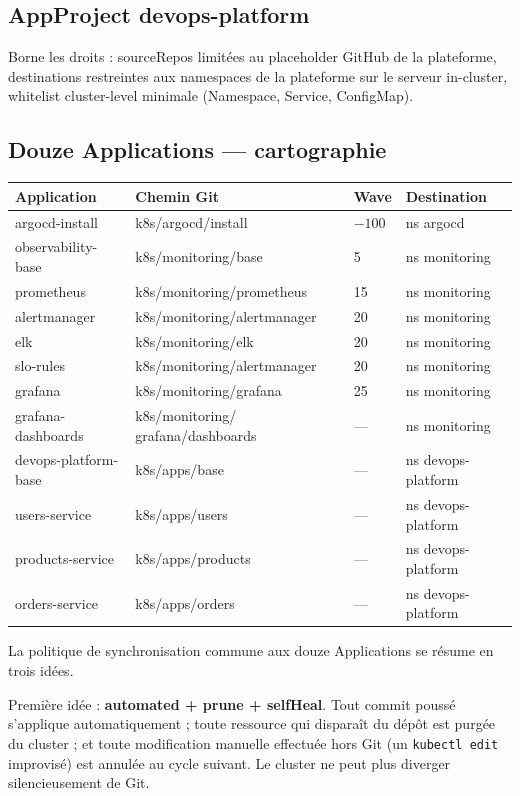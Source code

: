 \documentclass[12pt,a4paper]{article}
\begin{document}
\subsection{AppProject devops-platform}
Borne les droits : sourceRepos limitées au placeholder GitHub de la plateforme, destinations restreintes aux namespaces de la plateforme sur le serveur in-cluster, whitelist cluster-level minimale (Namespace, Service, ConfigMap).

\subsection{Douze Applications --- cartographie}
\begin{longtable}{@{}p{3.4cm}p{5.2cm}p{1.6cm}p{3.4cm}@{}}
\toprule
\textbf{Application} & \textbf{Chemin Git} & \textbf{Wave} & \textbf{Destination} \\
\midrule
\endhead
argocd-install & k8s/argocd/install & $-100$ & ns argocd \\
observability-base & k8s/monitoring/base & 5 & ns monitoring \\
prometheus & k8s/monitoring/prometheus & 15 & ns monitoring \\
alertmanager & k8s/monitoring/alertmanager & 20 & ns monitoring \\
elk & k8s/monitoring/elk & 20 & ns monitoring \\
slo-rules & k8s/monitoring/alertmanager & 20 & ns monitoring \\
grafana & k8s/monitoring/grafana & 25 & ns monitoring \\
grafana-dashboards & k8s/monitoring/ grafana/dashboards & --- & ns monitoring \\
devops-platform-base & k8s/apps/base & --- & ns devops-platform \\
users-service & k8s/apps/users & --- & ns devops-platform \\
products-service & k8s/apps/products & --- & ns devops-platform \\
orders-service & k8s/apps/orders & --- & ns devops-platform \\
\bottomrule
\end{longtable}

La politique de synchronisation commune aux douze Applications se résume en trois idées.

Première idée : \textbf{automated + prune + selfHeal}. Tout commit poussé s'applique automatiquement ; toute ressource qui disparaît du dépôt est purgée du cluster ; et toute modification manuelle effectuée hors Git (un \texttt{kubectl edit} improvisé) est annulée au cycle suivant. Le cluster ne peut plus diverger silencieusement de Git.
\end{document}
